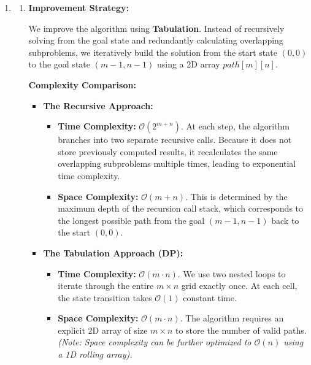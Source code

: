 \documentclass[12pt,a4paper]{article}
\makeatletter
\newtheorem*{solution}{Solution}
\theoremstyle{definition}
\renewenvironment{solution}[1][Solution] {\par\pushQED{\qed}\normalfont\topsep6\p@\@plus6\p@\relax\trivlist\item[\hskip\labelsep\bfseries#1\@addpunct{.}]\ignorespaces}{\popQED\endtrivlist\@endpefalse} \makeatother
\makeatother
\begin{document}
\begin{enumerate}
\begin{solution}
\begin{enumerate}
        \textbf{Usage:} call $\text{WW}(m-1,\,n-1,\,w)$.
            \item 
            \textbf{Improvement Strategy:}

            We improve the algorithm using \textbf{Tabulation}. Instead of recursively solving from the goal state and redundantly calculating overlapping subproblems, we iteratively build the solution from the start state $(0,0)$ to the goal state $(m-1, n-1)$ using a 2D array $path[m][n]$.
            
            \vspace{0.5em}
            \textbf{Complexity Comparison:}
            
            \begin{itemize}
                \item \textbf{The Recursive Approach:}
                \begin{itemize}
                    \item \textbf{Time Complexity:} $\mathcal{O}(2^{m+n})$. At each step, the algorithm branches into two separate recursive calls. Because it does not store previously computed results, it recalculates the same overlapping subproblems multiple times, leading to exponential time complexity.
                    \item \textbf{Space Complexity:} $\mathcal{O}(m+n)$. This is determined by the maximum depth of the recursion call stack, which corresponds to the longest possible path from the goal $(m-1, n-1)$ back to the start $(0,0)$.
                \end{itemize}
                
                \vspace{0.5em}
                \item \textbf{The Tabulation Approach (DP):}
                \begin{itemize}
                    \item \textbf{Time Complexity:} $\mathcal{O}(m \cdot n)$. We use two nested loops to iterate through the entire $m \times n$ grid exactly once. At each cell, the state transition takes $\mathcal{O}(1)$ constant time.
                    \item \textbf{Space Complexity:} $\mathcal{O}(m \cdot n)$. The algorithm requires an explicit 2D array of size $m \times n$ to store the number of valid paths. \textit{(Note: Space complexity can be further optimized to $\mathcal{O}(n)$ using a 1D rolling array).}
                \end{itemize}
            \end{itemize}
            

\end{enumerate}
\end{solution}
\end{enumerate}
\end{document}
